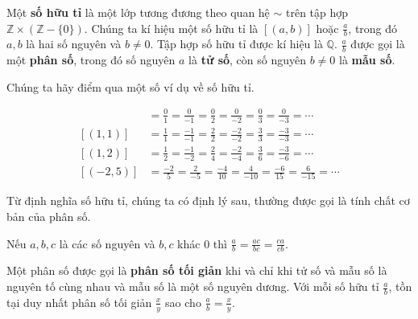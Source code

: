 \begin{definition}[Số hữu tỉ]
    Một \textbf{số hữu tỉ} là một lớp tương đương theo quan hệ $\sim$ trên tập hợp $\mathbb{Z}\times (\mathbb{Z} - \{0\})$. Chúng ta kí hiệu một số hữu tỉ là $[(a, b)]$ hoặc $\frac{a}{b}$, trong đó $a, b$ là hai số nguyên và $b\ne 0$. Tập hợp số hữu tỉ được kí hiệu là $\mathbb{Q}$.  $\frac{a}{b}$ được gọi là một \textbf{phân số}, trong đó số nguyên $a$ là \textbf{tử số}, còn số nguyên $b\ne 0$ là \textbf{mẫu số}.
\end{definition}

Chúng ta hãy điểm qua một số ví dụ về số hữu tỉ.
\begin{example}
    \begin{align*}
        [(0, 1)] & = \frac{0}{1} = \frac{0}{-1} = \frac{0}{2} = \frac{0}{-2} = \frac{0}{3} = \frac{0}{-3} = \cdots        \\
        [(1, 1)] & = \frac{1}{1} = \frac{-1}{-1} = \frac{2}{2} = \frac{-2}{-2} = \frac{3}{3} = \frac{-3}{-3} = \cdots     \\
        [(1, 2)] & = \frac{1}{2} = \frac{-1}{-2} = \frac{2}{4} = \frac{-2}{-4} = \frac{3}{6} = \frac{-3}{-6} = \cdots     \\
        [(-2,5)] & = \frac{-2}{5} = \frac{2}{-5} = \frac{-4}{10} = \frac{4}{-10} = \frac{-6}{15} = \frac{6}{-15} = \cdots
    \end{align*}
\end{example}

Từ định nghĩa số hữu tỉ, chúng ta có định lý sau, thường được gọi là tính chất cơ bản của phân số.
\begin{theorem}\label{theorem:fundamental-property-of-fraction}
    Nếu $a, b, c$ là các số nguyên và $b, c$ khác $0$ thì $\frac{a}{b} = \frac{ac}{bc} = \frac{ca}{cb}$.
\end{theorem}

\begin{theorem}
    Một phân số được gọi là \textbf{phân số tối giản} khi và chỉ khi tử số và mẫu số là nguyên tố cùng nhau và mẫu số là một số nguyên dương. Với mỗi số hữu tỉ $\frac{a}{b}$, tồn tại duy nhất phân số tối giản $\frac{x}{y}$ sao cho $\frac{a}{b} = \frac{x}{y}$.
\end{theorem}

